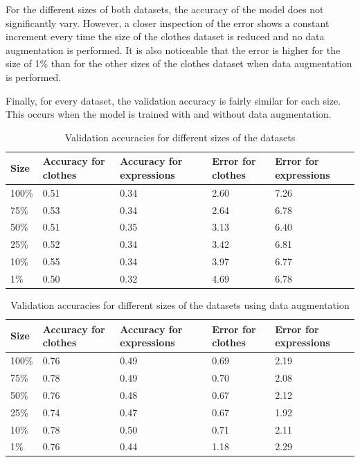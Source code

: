 \documentclass{article}
\begin{document}
For the different sizes of both datasets, the accuracy of the model does not significantly vary. However, a closer inspection of the error shows a constant increment every time the size of the clothes dataset is reduced and no data augmentation is performed. It is also noticeable that the error is higher for the size of 1\% than for the other sizes of the clothes dataset when data augmentation is performed.

Finally, for every dataset, the validation accuracy is fairly similar for each size. This occurs when the model is trained with and without data augmentation.

\begin{table}[!htb]
  \centering
  \begin{tabular}{| l | l | l | l | l |}
    \hline
    \textbf{Size} & \textbf{Accuracy for clothes} & \textbf{Accuracy for expressions}& \textbf{Error for clothes} & \textbf{Error for expressions}\\ \hline
    100\% & 0.51 & 0.34 & 2.60 & 7.26 \\ \hline
    75\% & 0.53  & 0.34 & 2.64 & 6.78\\ \hline
    50\% & 0.51 & 0.35 &  3.13 & 6.40\\ \hline
    25\% & 0.52 & 0.34 & 3.42 & 6.81\\ \hline
    10\% & 0.55 & 0.34 & 3.97 & 6.77\\ \hline
    1\% & 0.50 & 0.32 & 4.69 & 6.78\\ \hline

  \end{tabular}
  \caption{Validation accuracies for different sizes of the datasets}
  \label{tab:2}
\end{table}

\begin{table}[!htb]
  \centering
  \begin{tabular}{| l | l | l | l | l |}
    \hline
    \textbf{Size} & \textbf{Accuracy for clothes} & \textbf{Accuracy for expressions}& \textbf{Error for clothes} & \textbf{Error for expressions}\\ \hline
    100\% & 0.76 & 0.49 & 0.69 & 2.19\\ \hline
    75\% & 0.78  & 0.49 & 0.70 & 2.08\\ \hline
    50\% & 0.76 & 0.48 & 0.67 & 2.12\\ \hline
    25\% & 0.74 & 0.47 & 0.67 & 1.92\\ \hline
    10\% & 0.78 & 0.50 & 0.71 & 2.11\\ \hline
    1\% & 0.76 & 0.44 & 1.18 & 2.29\\ \hline

  \end{tabular}
  \caption{Validation accuracies for different sizes of the datasets using data augmentation}
  \label{tab:3}
\end{table}
\end{document}
